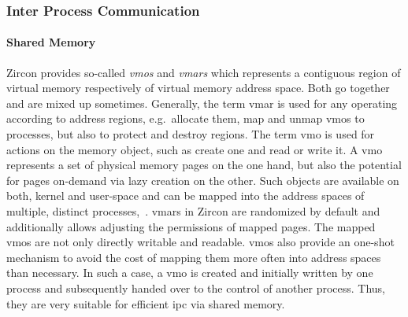 \subsubsection*{Inter Process Communication}
\paragraph{Shared Memory}
Zircon provides so-called \textit{\acp{vmo}} and \textit{\acp{vmar}} which represents a contiguous region of virtual memory respectively of virtual memory address space.
Both go together and are mixed up sometimes.
Generally, the term \ac{vmar} is used for any operating according to address regions, e.g.\ allocate them, map and unmap \acp{vmo} to processes, but also to protect and destroy regions\cite{zircon-vmar}.
The term \ac{vmo} is used for actions on the memory object, such as create one and read or write it\cite{zircon-vmo}.
A \ac{vmo} represents a set of physical memory pages on the one hand, but also the potential for pages on-demand via lazy creation on the other.
Such objects are available on both, kernel and user-space and can be mapped into the address spaces of multiple, distinct processes\cite{zircon-vmo},~\cite{zircon-concepts}.
\acp{vmar} in Zircon are randomized by default and additionally allows adjusting the permissions of mapped pages\cite{zircon-vmar}.
The mapped \acp{vmo} are not only directly writable and readable.
\acp{vmo} also provide an one-shot mechanism to avoid the cost of mapping them more often into address spaces than necessary.
In such a case, a \ac{vmo} is created and initially written by one process and subsequently handed over to the control of another process\cite{zircon-concepts}.
Thus, they are very suitable for efficient \ac{ipc} via shared memory.

%

